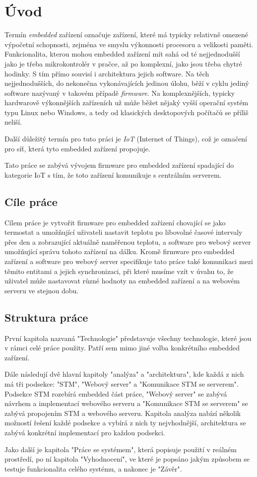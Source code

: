 \chapter*{Úvod}

Termín \emph{embedded} zařízení označuje zařízení, které má typicky relativně omezené výpočetní schopnosti,
zejména ve smyslu výkonnosti procesoru a velikosti paměti.
Funkcionalita, kterou mohou embedded zařízení mít sahá od té nejjednodušší jako je třeba mikrokontrolér
v pračce, až po komplexní, jako jsou třeba chytré hodinky.
S tím přímo souvisí i architektura jejich software.
Na těch nejjednodušších, do nekonečna vykonávajících jedinou úlohu, běží v cyklu jediný software
nazývaný v takovém případě \emph{firmware}.
Na komplexnějších, typicky hardwarově výkonnějších zařízeních už může běžet nějaký vyšší operační systém
typu Linux nebo Windows, a tedy od klasických desktopových počítačů se příliš neliší.

Další důležitý termín pro tuto práci je \emph{IoT} (Internet of Things), což je označení pro síť,
která tyto embedded zařízení propojuje.

Tato práce se zabývá vývojem firmware pro embedded zařízení spadající do kategorie IoT s tím,
že toto zařízení komunikuje s centrálním serverem.


\section{Cíle práce}
Cílem práce je vytvořit firmware pro embedded zařízení chovající se jako termostat a umožňující
uživateli nastavit teplotu po libovolné časové intervaly přes den a zobrazující aktuálně naměřenou
teplotu, a software pro webový server umožňující správu tohoto zařízení na dálku.
Kromě firmware pro embedded zařízení a software pro webový server specifikuje tato práce také
komunikaci mezi těmito entitami a jejich synchronizaci, při které musíme vzít v úvahu to, že uživatel
může nastavovat různé hodnoty na embedded zařízení a na webovém serveru ve stejnou dobu.

\section{Struktura práce}
První kapitola nazvaná "Technologie" představuje všechny technologie, které jsou v rámci celé práce
použity.
Patří sem mimo jiné volba konkrétního embedded zařízení.

Dále následují dvě hlavní kapitoly "analýza" a "architektura", kde každá z nich má tři podsekce: "STM",
"Webový server" a "Komunikace STM se serverem".
Podsekce STM rozebírá embedded část práce, "Webový server" se zabývá návrhem a implementací webového serveru
a "Komunikace STM se serverem" se zabývá propojením STM a webového serveru.
Kapitola analýza nabízí několik možností řešení každé podsekce a vybírá z nich ty nejvhodnější,
architektura se zabývá konkrétní implementací pro každou podsekci.

Jako další je kapitola "Práce se systémem", která popisuje použití v reálném prostředí, po ní kapitola
"Vyhodnocení", ve které je popsáno jakým způsobem se testuje funkcionalita celého systému, a nakonec
je "Závěr".
